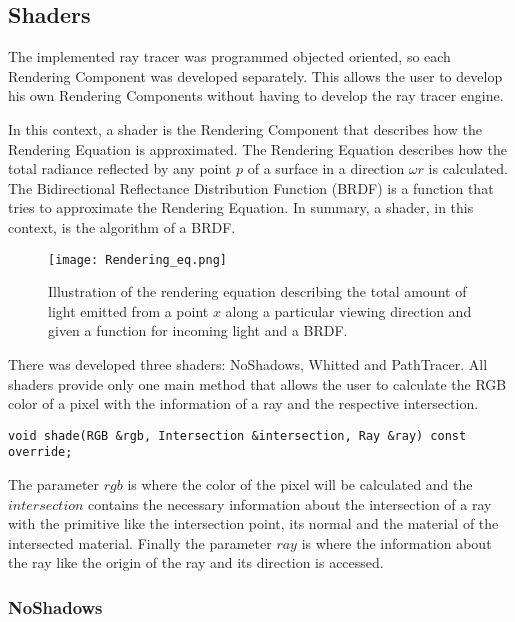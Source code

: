 \subsection{Shaders}

\par
The implemented ray tracer was programmed objected oriented, so each Rendering Component was developed separately.
This allows the user to develop his own Rendering Components without having to develop the ray tracer engine.

\par
In this context, a shader is the Rendering Component that describes how the Rendering Equation is approximated.
The Rendering Equation describes how the total radiance reflected by any point
$p$
of a surface in a direction
$\omega$$r$
is calculated.
The Bidirectional Reflectance Distribution Function (BRDF) is a function that tries to approximate the Rendering Equation.
In summary, a shader, in this context, is the algorithm of a BRDF.

\begin{figure}[H]
	\centering
	\caption{Illustration of the rendering equation describing the total amount of light emitted from a point
	$x$
	along a particular viewing direction and given a function for incoming light and a BRDF.}
	\label{Rendering_Equation.}
	\texttt{[image: Rendering\_eq.png]}
\end{figure}

\par
There was developed three shaders: NoShadows, Whitted and PathTracer.
All shaders provide only one main method that allows the user to calculate the RGB color of a pixel with the information of a ray and the respective intersection.

\begin{lstlisting}
void shade(RGB &rgb, Intersection &intersection, Ray &ray) const override;
\end{lstlisting}

\par
The parameter
$rgb$
is where the color of the pixel will be calculated and the
$intersection$
contains the necessary information about the intersection of a ray with the primitive like the intersection point, its normal and the material of the intersected material.
Finally the parameter
$ray$
is where the information about the ray like the origin of the ray and its direction is accessed.

\subsubsection{NoShadows}


